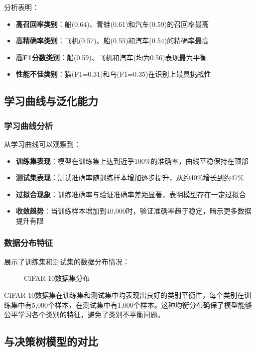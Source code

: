 \documentclass[UTF8]{report}
\theoremstyle{MyLineTheoremStyle} %
\theoremstyle{MyBlockTheoremStyle} %
\theoremstyle{MySubsubsectionStyle} %
\begin{document}
分析表明：
\begin{itemize}
    \item \textbf{高召回率类别}：船(0.64)、青蛙(0.61)和汽车(0.59)的召回率最高
    \item \textbf{高精确率类别}：飞机(0.57)、船(0.55)和汽车(0.54)的精确率最高
    \item \textbf{高F1分数类别}：船(0.59)、飞机和汽车(均为0.56)表现最为平衡
    \item \textbf{性能不佳类别}：猫(F1=0.31)和鸟(F1=0.35)在识别上最具挑战性
\end{itemize}

\subsection{学习曲线与泛化能力}

\subsubsection{学习曲线分析}
从学习曲线可以观察到：
\begin{itemize}
    \item \textbf{训练集表现}：模型在训练集上达到近乎100\%的准确率，曲线平稳保持在顶部
    \item \textbf{测试集表现}：测试准确率随训练样本增加逐步提升，从约40\%增长到约47\%
    \item \textbf{过拟合现象}：训练准确率与验证准确率差距显著，表明模型存在一定过拟合
    \item \textbf{收敛趋势}：当训练样本增加到40,000时，验证准确率趋于稳定，暗示更多数据提升有限
\end{itemize}

\subsubsection{数据分布特征}
展示了训练集和测试集的数据分布情况：

\begin{figure}[h]
\centering
\caption{CIFAR-10数据集分布}
\label{fig:rf_data_distribution}
\end{figure}

CIFAR-10数据集在训练集和测试集中均表现出良好的类别平衡性，每个类别在训练集中有5,000个样本，在测试集中有1,000个样本。这种均衡分布确保了模型能够公平学习各个类别的特征，避免了类别不平衡问题。

\subsection{与决策树模型的对比}
\end{document}
